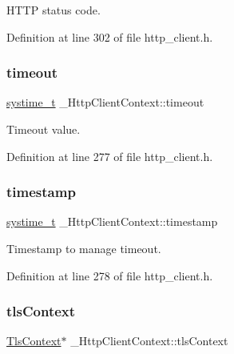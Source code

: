 H\+T\+TP status code. 



Definition at line 302 of file http\+\_\+client.\+h.

\mbox{\label{struct__HttpClientContext_a7c3a1625275db84fa6dcd6947d70e336}} 
\subsubsection{\texorpdfstring{timeout}{timeout}}
{\footnotesize\ttfamily \hyperlink{compiler__port_8h_ae3e32a98d431a02106616da3071832dd}{systime\+\_\+t} \+\_\+\+Http\+Client\+Context\+::timeout}



Timeout value. 



Definition at line 277 of file http\+\_\+client.\+h.

\mbox{\label{struct__HttpClientContext_aa8c652b78a89b8349b845d9439e8a4b8}} 
\subsubsection{\texorpdfstring{timestamp}{timestamp}}
{\footnotesize\ttfamily \hyperlink{compiler__port_8h_ae3e32a98d431a02106616da3071832dd}{systime\+\_\+t} \+\_\+\+Http\+Client\+Context\+::timestamp}



Timestamp to manage timeout. 



Definition at line 278 of file http\+\_\+client.\+h.

\mbox{\label{struct__HttpClientContext_af79c22926c55f364ea95555d10f085fc}} 
\subsubsection{\texorpdfstring{tls\+Context}{tlsContext}}
{\footnotesize\ttfamily \hyperlink{tls_8h_ac09f7a286c0cdf9b07ee1edd107946f5}{Tls\+Context}$\ast$ \+\_\+\+Http\+Client\+Context\+::tls\+Context}



